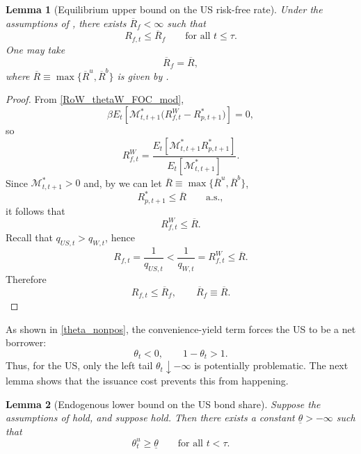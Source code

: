 \documentclass[12pt]{article}
\theoremstyle{plain}
\newtheorem{lem}{Lemma}
\begin{document}
\begin{lem}[Equilibrium upper bound on the US risk-free rate]\label{lem_rf_upper_bound}
Under the assumptions of , there exists
$\overline R_f<\infty$ such that
\[
R_{f,t}\le \overline R_f
\qquad\text{for all }t\le\tau.
\]
One may take
\[
\overline R_f=\overline R,
\]
where $\overline R\equiv \max \{\overline R^u, \overline R^b\}$ is given by .
\end{lem}

\begin{proof}
From \eqref{RoW_thetaW_FOC_mod},
\[
\beta E_t\!\left[\mathcal M_{t,t+1}^*\bigl(R_{f,t}^W-R_{p,t+1}^*\bigr)\right]=0,
\]
so
\[
R_{f,t}^W
=
\frac{E_t\!\left[\mathcal M_{t,t+1}^*R_{p,t+1}^*\right]}
{E_t\!\left[\mathcal M_{t,t+1}^*\right]}.
\]
Since $\mathcal M_{t,t+1}^*>0$ and, by  we can let $\overline R\equiv \max \{\overline R^u, \overline R^b\}$,
\[
R_{p,t+1}^*\le \overline R
\qquad\text{a.s.},
\]
it follows that
\[
R_{f,t}^W\le \overline R.
\]
Recall that $q_{US,t}>q_{W,t}$, hence
\[
R_{f,t}=\frac{1}{q_{US,t}}<\frac{1}{q_{W,t}}=R_{f,t}^W\le \overline R.
\]
Therefore
\[
R_{f,t}\le \overline R_f,
\qquad
\overline R_f\equiv \overline R.
\]
\end{proof}


As shown in \eqref{theta_nonpos}, the convenience-yield term forces the US to be a net borrower:
\[
\theta_t<0,
\qquad
1-\theta_t>1.
\]
Thus, for the US, only the left tail $\theta_t\downarrow-\infty$ is potentially problematic. The next lemma
shows that the issuance cost prevents this from happening.

\begin{lem}[Endogenous lower bound on the US bond share]\label{lem2}
Suppose the assumptions of  hold, and suppose
 hold. Then there exists a constant $\underline\theta>-\infty$ such that
\[
\theta_t^u\ge \underline\theta
\qquad\text{for all }t<\tau.
\]
\end{lem}
\end{document}
